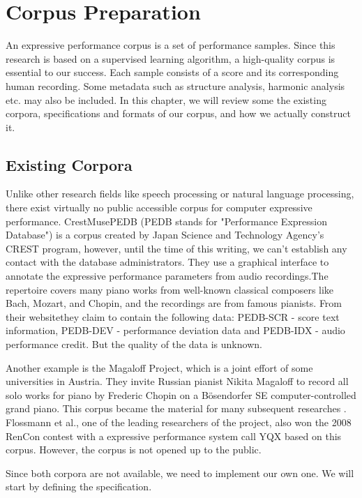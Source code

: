 \chapter{Corpus Preparation}
\label{chap:corpus}
  An expressive performance corpus is a set of performance samples. Since this research is based on a supervised learning algorithm, a high-quality corpus is essential to our success. Each sample consists of a score and its corresponding human recording. Some metadata such as structure analysis, harmonic analysis etc. may also be included. In this chapter, we will review some the existing corpora, specifications and formats of our corpus, and how we actually construct it.

\section{Existing Corpora} 
Unlike other research fields like speech processing or natural language processing, there exist virtually no public accessible corpus for computer expressive performance. CrestMusePEDB\cite{crestmuse} (PEDB stands for "Performance Expression Database") is a corpus created by Japan Science and Technology Agency's CREST program, however, until the time of this writing, we can't establish any contact with the database administrators. They use a graphical interface to annotate the expressive performance parameters from audio recordings.The repertoire covers many piano works from well-known classical composers like Bach, Mozart, and Chopin, and the recordings are from famous pianists. From their website\cite{crestmuse}they claim to contain the following data: PEDB-SCR - score text information, PEDB-DEV - performance deviation data and PEDB-IDX - audio performance credit. But the quality of the data is unknown.

Another example is the Magaloff Project\cite{magaloff}, which is a joint effort of some universities in Austria.  They invite Russian pianist Nikita Magaloff to record all solo works for piano by Frederic Chopin on a Bösendorfer SE computer-controlled grand piano. This corpus became the material for many subsequent researches \cite{Goebl2009, Grachten2011, Flossmann2009, Grachten2012, Flossmann2013, Flossman2011, Flossmann2010a}. Flossmann et al., one of the leading researchers of the project, also won the 2008 RenCon contest with a expressive performance system call YQX\cite{yqx} based on this corpus. However, the corpus is not opened up to the public. 

Since both corpora are not available, we need to implement our own one. We will start by defining the specification.

